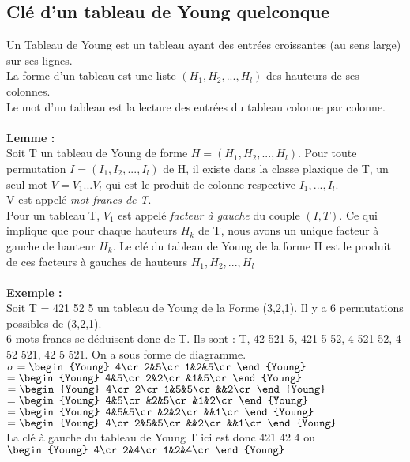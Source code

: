 \documentclass{book}
\begin{document}
\subsection{Clé d'un tableau de Young quelconque}
Un Tableau de Young est un tableau ayant des entrées croissantes (au sens large) sur ses lignes. \\
La forme d'un tableau est une liste $(H_1,H_2,...,H_l)$ des hauteurs de ses colonnes. \\
Le mot d'un tableau est la lecture des entrées du tableau colonne par colonne.  \\\\
\textbf{Lemme : }\\
 Soit T un tableau de Young de forme $H=(H_1, H_2, ..., H_l)$. Pour toute permutation $I=(I_1, I_2, ..., I_l)$ de H, il existe dans la classe plaxique de T, un seul mot $V=V_1...V_l$ qui est le produit de colonne respective $I_1, ..., I_l$. \\
 V est appelé \textit{mot francs de T}. \\
 Pour un tableau T, $V_1$ est appelé \textit{facteur à gauche} du couple $(I, T)$. Ce qui implique que pour chaque hauteurs $H_k$ de T, nous avons un unique facteur à gauche de hauteur $H_k$. Le clé du tableau de Young de la forme H est le produit de ces facteurs à gauches de hauteurs $H_1,H_2,...,H_l$\\\\
 \textbf{Exemple : }\\
 Soit T = 421 52 5 un tableau de Young de la Forme (3,2,1). Il y a 6 permutations possibles de (3,2,1). \\
 6 mots francs se déduisent donc de T. Ils sont : T, 42 521 5, 421 5 52, 4 521 52, 4 52 521, 42 5 521. On a sous forme de diagramme. \\
 $
\sigma = \begin{Young}
4\cr
2&5\cr
1&2&5\cr
\end{Young}  
  $
   $
 = \begin{Young}
4&5\cr
2&2\cr
&1&5\cr
\end{Young}  
  $
 $
 = \begin{Young}
4\cr
2\cr
1&5&5\cr
&&2\cr
\end{Young}  
  $
  $
 = \begin{Young}
4&5\cr
&2&5\cr
&1&2\cr
\end{Young}  
  $
  $
 = \begin{Young}
4&5&5\cr
&2&2\cr
&&1\cr
\end{Young}  
  $
  $
 = \begin{Young}
4\cr
2&5&5\cr
&&2\cr
&&1\cr
\end{Young}  
  $\\
  La clé à gauche du tableau de Young T ici est donc 421 42 4 ou $
 \begin{Young}
4\cr
2&4\cr
1&2&4\cr
\end{Young}$ \\
\end{document}
